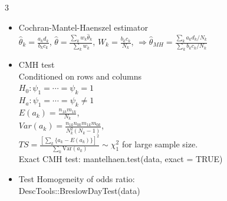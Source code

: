 \documentclass[a4paper,10pt]{article}
\begin{document}
\begin{multicols}{3}
\begin{itemize}
    \item Cochran-Mantel-Haenszel estimator\\
    $\hat{\theta}_k = \frac{a_k d_k}{b_k c_k}$, $\hat{\theta} = \frac{\sum_k w_k \hat{\theta}_k}{\sum_k w_k}$, $W_k = \frac{b_k c_k}{N_k}$, $\Rightarrow \hat{\theta}_{MH} = \frac{\sum_k a_k d_k/N_k}{\sum_k b_k c_k/N_k}$
    \item CMH test \\Conditioned on rows and columns\\
    $H_0 : \psi_1 = \cdots = \psi_k = 1 $\\$ H_a : \psi_1 = \cdots = \psi_k \neq 1$\\
    $E(a_k) = \frac{n_{1k} m_{1k}}{N_k}$,\\ $Var(a_k) = \frac{n_{1k} n_{0k} m_{1k} m_{0k}}{N_k^2 (N_k - 1)}$,\\ $TS=\frac{\left[\sum_k \{a_k - E(a_k)\}\right]^2}{\sum_k \text{Var}(a_k)}\sim \chi_1^2$ for large sample size.\\
    Exact CMH test: mantelhaen.test(data, exact = TRUE)
    \item Test Homogeneity of odds ratio:\\ DescTools::BreslowDayTest(data)
    


\end{itemize}


\end{multicols}
\end{document}
